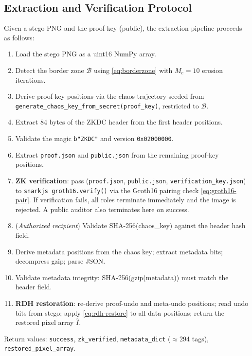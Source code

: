 \documentclass{jstarticle}
\begin{document}
\subsection{Extraction and Verification Protocol}
\label{subsec:extraction}

Given a stego PNG and the proof key (public), the extraction pipeline proceeds as follows:

\begin{enumerate}
  \item Load the stego PNG as a uint16 NumPy array.
  \item Detect the border zone $\mathcal{B}$ using \eqref{eq:borderzone} with
    $M_e = 10$ erosion iterations.
  \item Derive proof-key positions via the chaos trajectory seeded from
    \texttt{generate\_chaos\_key\_from\_secret(proof\_key)}, restricted
    to $\mathcal{B}$.
  \item Extract 84 bytes of the ZKDC header from the first header positions.
  \item Validate the magic \texttt{b"ZKDC"} and version
    \texttt{0x02000000}.
  \item Extract \texttt{proof.json} and \texttt{public.json} from the
    remaining proof-key positions.
  \item \textbf{ZK verification}: pass
    (\texttt{proof.json}, \texttt{public.json},
    \texttt{verification\_key.json}) to
    \texttt{snarkjs groth16.verify()} via the Groth16 pairing check
    \eqref{eq:groth16-pair}.
    If verification fails, all roles terminate immediately and the image is rejected.
    A public auditor also terminates here on success.
  \item (\emph{Authorized recipient}) Validate SHA-256(chaos\_key) against
    the header hash field.
  \item Derive metadata positions from the chaos key; extract metadata bits;
    decompress gzip; parse JSON.
  \item Validate metadata integrity: SHA-256(gzip(metadata)) must match the
    header field.
  \item \textbf{RDH restoration}: re-derive proof-undo and meta-undo
    positions; read undo bits from stego; apply \eqref{eq:rdh-restore} to
    all data positions; return the restored pixel array $\hat{I}$.
\end{enumerate}

\noindent
Return values: \texttt{success}, \texttt{zk\_verified},
\texttt{metadata\_\allowbreak dict} ($\approx$294 tags), \texttt{restored\_\allowbreak pixel\_\allowbreak array}.
\end{document}
